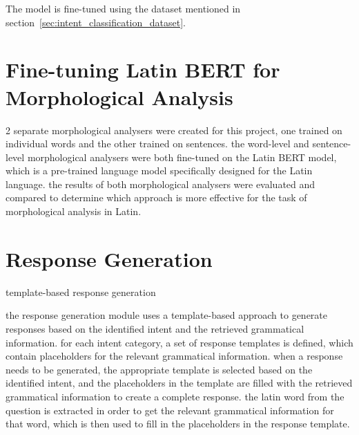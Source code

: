 The model is fine-tuned using the dataset mentioned in section~\ref{sec:intent_classification_dataset}.

\section{Fine-tuning Latin BERT for Morphological Analysis}
\label{sec:fine_tuning_latin_bert_for_morphological_analysis}




2 separate morphological analysers were created for this project, one trained on individual words and the other trained on sentences.
the word-level and sentence-level morphological analysers were both fine-tuned on the Latin BERT model, which is a pre-trained language model specifically designed for the Latin language.
the results of both morphological analysers were evaluated and compared to determine which approach is more effective for the task of morphological analysis in Latin.

\section{Response Generation}
\label{sec:response_generation}

template-based response generation

the response generation module uses a template-based approach to generate responses based on the identified intent and the retrieved grammatical information.
for each intent category, a set of response templates is defined, which contain placeholders for the relevant grammatical information.
when a response needs to be generated, the appropriate template is selected based on the identified intent, and the placeholders in the template are filled with the retrieved grammatical information to create a complete response.
the latin word from the question is extracted in order to get the relevant grammatical information for that word, which is then used to fill in the placeholders in the response template.

